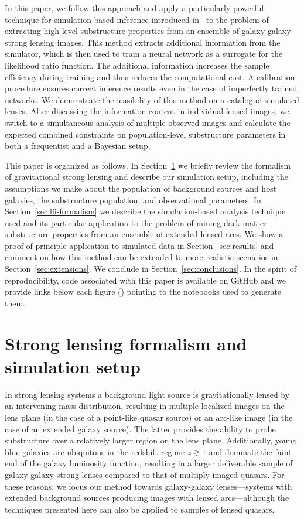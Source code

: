 \documentclass[twocolumn]{aastex63}
\begin{document}
In this paper, we follow this approach and apply a particularly powerful technique for simulation-based inference introduced in~\citet{1805.00013, 1805.00020, 1805.12244, Stoye:2018ovl} to the problem of extracting high-level substructure properties from an ensemble of galaxy-galaxy strong lensing images. This method extracts additional information from the simulator, which is then used to train a neural network as a surrogate for the likelihood ratio function. The additional information increases the sample efficiency during training and thus reduces the computational cost. A calibration procedure ensures correct inference results even in the case of imperfectly trained networks. We demonstrate the feasibility of this method on a catalog of simulated lenses. After discussing the information content in individual lensed images, we switch to a simultaneous analysis of multiple observed images and calculate the expected combined constraints on population-level substructure parameters in both a frequentist and a Bayesian setup.

This paper is organized as follows. In Section~\ref{sec:lensing-formalism} we briefly review the formalism of gravitational strong lensing and describe our simulation setup, including the assumptions we make about the population of background sources and host galaxies, the substructure population, and observational parameters. In Section~\ref{sec:lfi-formalism} we describe the simulation-based analysis technique used and its particular application to the problem of mining dark matter substructure properties from an ensemble of extended lensed arcs. We show a proof-of-principle application to simulated data in Section~\ref{sec:results} and comment on how this method can be extended to more realistic scenarios in Section~\ref{sec:extensions}. We conclude in Section~\ref{sec:conclusions}. In the spirit of reproducibility, code associated with this paper is available on GitHub \githubmaster and we provide links below each figure (\nbicon) pointing to the  notebooks used to generate them.

\section{Strong lensing formalism and simulation setup}
\label{sec:lensing-formalism}

In strong lensing systems a background light source is gravitationally lensed by an intervening mass distribution, resulting in multiple localized images on the lens plane (in the case of a point-like quasar source) or an arc-like image (in the case of an extended galaxy source). The latter provides the ability to probe substructure over a relatively larger region on the lens plane. Additionally, young, blue galaxies are ubiquitous in the redshift regime $z\gtrsim1$ and dominate the faint end of the galaxy luminosity function, resulting in a larger deliverable sample of galaxy-galaxy strong lenses compared to that of multiply-imaged quasars. For these reasons, we focus our method towards galaxy-galaxy lenses---systems with extended background sources producing images with lensed arcs---although the techniques presented here can also be applied to samples of lensed quasars.
\end{document}
